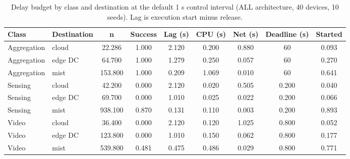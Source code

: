 \begin{table}
\centering
\scriptsize
\caption{Delay budget by class and destination at the default 1 s control interval (ALL architecture, 40 devices, 10 seeds). Lag is execution start minus release.}
\label{tab:p1-budget}
\begin{tabular}{llccccccc}
\toprule
Class & Destination & n & Success & Lag (s) & CPU (s) & Net (s) & Deadline (s) & Started \\
\midrule
Aggregation & cloud & 22.286 & 1.000 & 2.120 & 0.200 & 0.880 & 60 & 0.093 \\
Aggregation & edge DC & 64.700 & 1.000 & 1.279 & 0.250 & 0.057 & 60 & 0.270 \\
Aggregation & mist & 153.800 & 1.000 & 0.209 & 1.069 & 0.010 & 60 & 0.641 \\
Sensing & cloud & 42.200 & 0.000 & 2.120 & 0.020 & 0.505 & 0.200 & 0.040 \\
Sensing & edge DC & 69.700 & 0.000 & 1.010 & 0.025 & 0.022 & 0.200 & 0.066 \\
Sensing & mist & 938.100 & 0.870 & 0.131 & 0.110 & 0.003 & 0.200 & 0.893 \\
Video & cloud & 36.400 & 0.000 & 2.120 & 0.120 & 1.025 & 0.800 & 0.052 \\
Video & edge DC & 123.800 & 0.000 & 1.010 & 0.150 & 0.062 & 0.800 & 0.177 \\
Video & mist & 539.800 & 0.481 & 0.475 & 0.486 & 0.029 & 0.800 & 0.771 \\
\bottomrule
\end{tabular}
\par\vspace{2pt}{\footnotesize\raggedright Lag is release to execution start, averaged only over tasks that actually began: tasks killed before dispatch have no start timestamp and are excluded (the Started column gives the retained share). Every infrastructure placement waits roughly one control tick before execution; mist placements start at release.\par}
\end{table}
